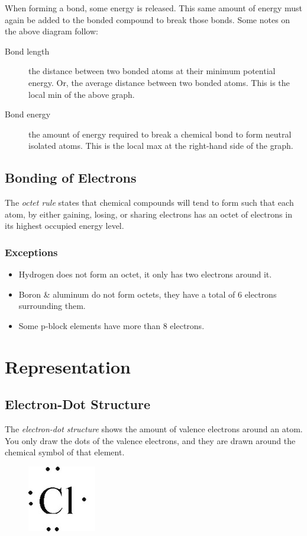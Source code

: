 When forming a bond, some energy is released.  This same amount of energy must
again be added to the bonded compound to break those bonds.  Some notes on the above diagram follow:

\begin{description}
  \item[Bond length] the distance between two bonded atoms at their minimum
    potential energy.  Or, the average distance between two bonded atoms.  This
    is the local min of the above graph.
  \item[Bond energy] the amount of energy required to break a chemical bond to
    form neutral isolated atoms.  This is the local max at the right-hand side
    of the graph.
\end{description}

\subsection{Bonding of Electrons}
The \textit{octet rule} states that chemical compounds will tend to form such
that each atom, by either gaining, losing, or sharing electrons has an octet of
electrons in its highest occupied energy level.

\subsubsection{Exceptions}
\begin{itemize}
  \item Hydrogen does not form an octet, it only has two electrons around it.
  \item Boron \& aluminum do not form octets, they have a total of 6 electrons
    surrounding them.
  \item Some p-block elements have more than 8 electrons.
\end{itemize}

\section{Representation}
\subsection{Electron-Dot Structure}
The \textit{electron-dot structure} shows the amount of valence electrons around
an atom.  You only draw the dots of the valence electrons, and they are drawn
around the chemical symbol of that element.

\begin{figure}[H]
  \centering
  \includegraphics{res/electron_dot_structure.jpg}
\end{figure}

